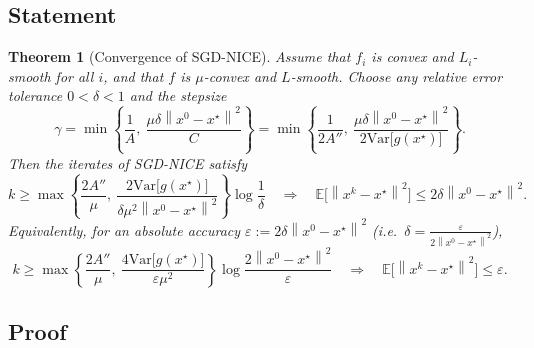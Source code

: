 \documentclass[11pt,a4paper]{article}
\newcommand{\E}{\mathbb{E}}
\newcommand{\norm}[1]{\left\| #1 \right\|}
\newcommand{\xs}{x^\star}
\newcommand{\Var}{\mathrm{Var}}
\newtheorem*{theorem}{Theorem}
\begin{document}
\subsection*{Statement}

\begin{theorem}[Convergence of SGD-NICE]
Assume that $f_i$ is convex and $L_i$-smooth for all $i$, and that $f$ is $\mu$-convex and $L$-smooth.
Choose any relative error tolerance $0 < \delta < 1$ and the stepsize
\[
  \gamma = \min\left\{\frac{1}{A},\ \frac{\mu\delta\norm{x^0 - \xs}^2}{C}\right\}
  = \min\left\{\frac{1}{2A''},\ \frac{\mu\delta\norm{x^0 - \xs}^2}{2\Var\bigl[g(\xs)\bigr]}\right\}.
\]
Then the iterates of SGD-NICE satisfy
\[
  k \ge \max\left\{\frac{2A''}{\mu},\ \frac{2\Var\bigl[g(\xs)\bigr]}{\delta\mu^2\norm{x^0 - \xs}^2}\right\}\log\frac{1}{\delta}
  \quad\Rightarrow\quad
  \E\bigl[\norm{x^k - \xs}^2\bigr] \le 2\delta\norm{x^0 - \xs}^2 .
\]
Equivalently, for an absolute accuracy $\varepsilon := 2\delta\norm{x^0 - \xs}^2$ (i.e.\ $\delta = \frac{\varepsilon}{2\norm{x^0 - \xs}^2}$),
\[
  k \ge \max\left\{\frac{2A''}{\mu},\ \frac{4\Var\bigl[g(\xs)\bigr]}{\varepsilon\mu^2}\right\}\log\frac{2\norm{x^0 - \xs}^2}{\varepsilon}
  \quad\Rightarrow\quad
  \E\bigl[\norm{x^k - \xs}^2\bigr] \le \varepsilon .
\]
\end{theorem}

\subsection*{Proof}
\end{document}

